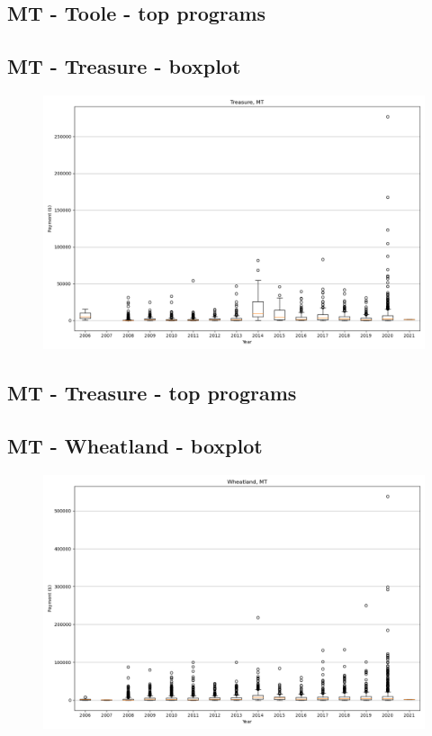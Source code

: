 \subsection*{MT - Toole - top programs}

\newpage
\subsection*{MT - Treasure - boxplot}
\begin{figure}[h]
\centering
\includegraphics[width=7in]{../output/boxplots/counties/Treasure-MT_boxplot.png}
\end{figure}


\subsection*{MT - Treasure - top programs}

\newpage
\subsection*{MT - Wheatland - boxplot}
\begin{figure}[h]
\centering
\includegraphics[width=7in]{../output/boxplots/counties/Wheatland-MT_boxplot.png}
\end{figure}


